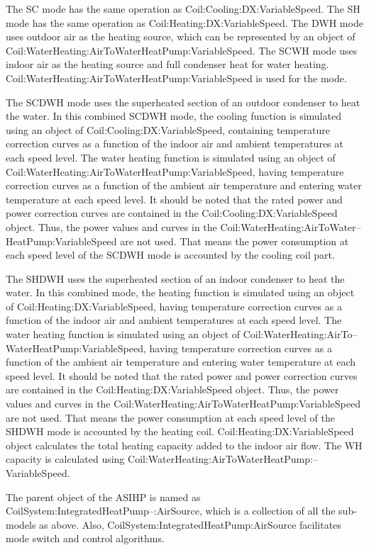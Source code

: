 The SC mode has the same operation as Coil:Cooling:DX:VariableSpeed. The SH mode has the same operation as Coil:Heating:DX:VariableSpeed. The DWH mode uses outdoor air as the heating source, which can be represented by an object of Coil:WaterHeating:AirToWaterHeatPump:VariableSpeed. The SCWH mode uses indoor air as the heating source and full condenser heat for water heating.  Coil:WaterHeating:AirToWaterHeatPump:VariableSpeed is used for the mode. 

The SCDWH mode uses the superheated section of an outdoor condenser to heat the water. In this combined SCDWH mode, the cooling function is simulated using an object of Coil:Cooling:DX:VariableSpeed, containing temperature correction curves as a function of the indoor air and ambient temperatures at each speed level. The water heating function is simulated using an object of Coil:WaterHeating:AirToWaterHeatPump:VariableSpeed, having temperature correction curves as a function of the ambient air temperature and entering water temperature at each speed level.  It should be noted that the rated power and power correction curves are contained in the Coil:Cooling:DX:VariableSpeed object. Thus, the power values and curves in the Coil:WaterHeating:AirToWater--HeatPump:VariableSpeed are not used. That means the power consumption at each speed level of the SCDWH mode is accounted by the cooling coil part. 

The SHDWH uses the superheated section of an indoor condenser to heat the water. In this combined mode, the heating function is simulated using an object of Coil:Heating:DX:VariableSpeed, having temperature correction curves as a function of the indoor air and ambient temperatures at each speed level. The water heating function is simulated using an object of Coil:WaterHeating:AirTo--WaterHeatPump:VariableSpeed, having temperature correction curves as a function of the ambient air temperature and entering water temperature at each speed level. It should be noted that the rated power and power correction curves are contained in the Coil:Heating:DX:VariableSpeed object. Thus, the power values and curves in the Coil:WaterHeating:AirToWaterHeatPump:VariableSpeed are not used. That means the power consumption at each speed level of the SHDWH mode is accounted by the heating coil. Coil:Heating:DX:VariableSpeed object calculates the total heating capacity added to the indoor air flow. The WH capacity is calculated using Coil:WaterHeating:AirToWaterHeatPump:--VariableSpeed. 

The parent object of the ASIHP is named as CoilSystem:IntegratedHeatPump--:AirSource, which is a collection of all the sub-models as above. Also, CoilSystem:IntegratedHeatPump:AirSource facilitates mode switch and control algorithms. 


